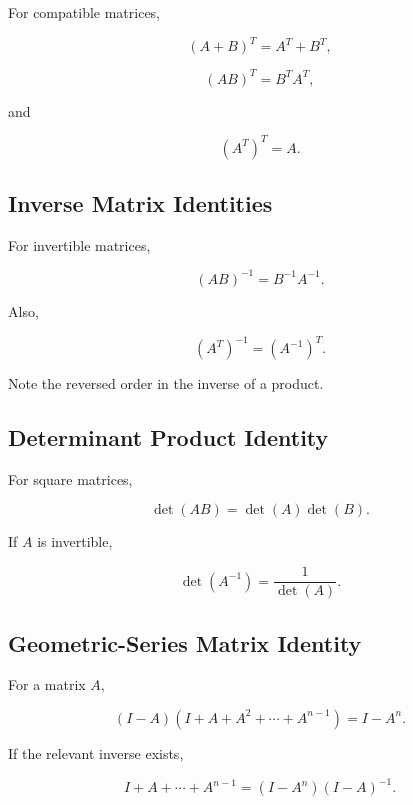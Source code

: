 For compatible matrices,

\[
\boxed{
(A+B)^T
=
A^T+B^T,
}
\]

\[
\boxed{
(AB)^T
=
B^TA^T,
}
\]

and

\[
\boxed{
(A^T)^T
=
A.
}
\]

\subsection{Inverse Matrix Identities}
\label{subsec:inverse-matrix-identities}

For invertible matrices,

\[
\boxed{
(AB)^{-1}
=
B^{-1}A^{-1}.
}
\]

Also,

\[
\boxed{
(A^T)^{-1}
=
(A^{-1})^T.
}
\]

Note the reversed order in the inverse of a product.

\subsection{Determinant Product Identity}
\label{subsec:determinant-product-identity}

For square matrices,

\[
\boxed{
\det(AB)
=
\det(A)\det(B).
}
\]

If \(A\) is invertible,

\[
\boxed{
\det(A^{-1})
=
\frac{1}{\det(A)}.
}
\]

\subsection{Geometric-Series Matrix Identity}
\label{subsec:matrix-geometric-series}

For a matrix \(A\),

\[
\boxed{
(I-A)
(I+A+A^2+\cdots+A^{n-1})
=
I-A^n.
}
\]

If the relevant inverse exists,

\[
\boxed{
I+A+\cdots+A^{n-1}
=
(I-A^n)(I-A)^{-1}.
}
\]


